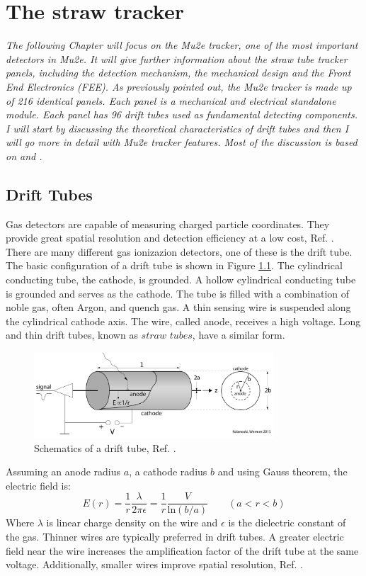\chapter{The straw tracker}\label{chaptertrk}

\textit{The following Chapter will focus on the Mu2e tracker, one of the most important detectors in Mu2e. 
It will give further information about the straw tube tracker panels, 
including the detection mechanism, the mechanical design and the Front End Electronics (FEE).
As previously pointed out, the Mu2e tracker is made up of 216 identical panels. 
Each panel is a mechanical and electrical standalone module. Each panel has 96 drift 
tubes used as fundamental detecting components. I will start by discussing the 
theoretical characteristics of drift tubes and then I will go more in detail with Mu2e tracker features. 
Most of the discussion is based on \cite{kola} and \cite{bobbb}.}

\section{Drift Tubes}
Gas detectors are capable of measuring charged particle coordinates. 
They provide great spatial resolution and detection efficiency at a low cost, Ref. \cite{kola}. 
There are many different gas ionizazion detectors, one of these is the drift tube.
The basic configuration of a drift tube is shown in Figure \ref{fig:drifttube}.
The cylindrical conducting tube, the cathode, is grounded.
A hollow cylindrical conducting tube is grounded and serves as the cathode.
The tube is filled with a combination of noble gas, often Argon, and quench gas. 
A thin sensing wire is suspended along the cylindrical cathode axis. 
The wire, called anode, receives a high voltage. Long and thin drift tubes, known as $straw$ $tubes$, have a similar form.
\begin{figure}[!h]
    \centering
    \includegraphics[width =0.8\textwidth]{figures/png/Screenshot_20240324_232621.png}
    \caption{Schematics of a drift tube, Ref. \cite{kola}.}
    \label{fig:drifttube}
    \end{figure}
Assuming an anode radius $a$, a cathode radius $b$ and using Gauss theorem, the electric field is:
\begin{equation}\label{avalanche}
    E(r)=\frac{1}{r}\frac{\lambda}{2\pi \epsilon}=\frac{1}{r}\frac{V}{ \text{ln}(b/a)} \qquad (a<r<b)
\end{equation}
Where $\lambda$ is linear charge density on the wire and $\epsilon$ is the dielectric constant of the gas.
Thinner wires are typically preferred in drift tubes. A greater electric field near the wire increases the amplification factor 
of the drift tube at the same voltage. Additionally, smaller wires improve spatial resolution, Ref. \cite{kola}. 
